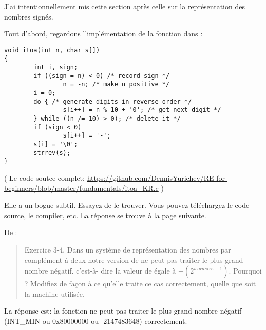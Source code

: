 
J'ai intentionnellement mis cette section après celle sur la représentation des nombres
signés.

Tout d'abord, regardons l'implémentation de la fonction   dans \InSqBrackets{\KRBook}:

\begin{lstlisting}[style=customc]
void itoa(int n, char s[])
{
        int i, sign;
        if ((sign = n) < 0) /* record sign */
                n = -n; /* make n positive */
        i = 0;
        do { /* generate digits in reverse order */
                s[i++] = n % 10 + '0'; /* get next digit */
        } while ((n /= 10) > 0); /* delete it */
        if (sign < 0)
                s[i++] = '-';
        s[i] = '\0';
        strrev(s);
}
\end{lstlisting}

( Le code soutce complet: \url{https://github.com/DennisYurichev/RE-for-beginners/blob/master/fundamentals/itoa_KR.c} )

Elle a un bogue subtil. Essayez de le trouver. Vous pouvez téléchargez le code source,
le compiler, etc.
La réponse se trouve à la page suivante.

\clearpage

De \InSqBrackets{\KRBook}:

\begin{framed}
\begin{quotation}
Exercice 3-4. Dans un système de représentation des nombres par complément à deux
notre version de  ne peut pas traiter le plus grand nombre négatif. c'est-à-
dire la valeur de  égale à $-(2^{wordsize-1})$. Pourquoi ? Modifiez 
de façon à ce qu'elle traite ce cas correctement, quelle que soit la machine utilisée.
\end{quotation}
\end{framed}

La réponse est: la fonction ne peut pas traiter le plus grand nombre négatif (INT\_MIN
ou 0x80000000 ou -2147483648) correctement.

